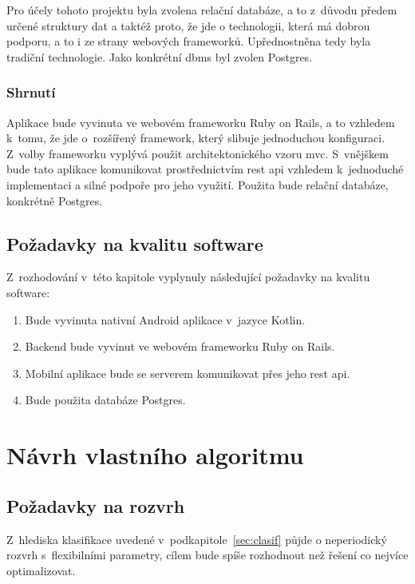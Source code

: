 \documentclass[a4paper,11pt,openany,twoside]{book}
\begin{document}
Pro účely tohoto projektu byla zvolena relační databáze, a to z~důvodu předem určené struktury dat a taktéž proto, že jde o technologii, která má dobrou podporu, a to i ze strany webových frameworků. Upřednostněna tedy byla tradiční technologie. Jako konkrétní \acs{dbms} byl zvolen Postgres.


\subsection{Shrnutí}

Aplikace bude vyvinuta ve webovém frameworku Ruby on Rails, a to vzhledem k~tomu, že jde o~rozšířený framework, který slibuje jednoduchou konfiguraci. Z~volby frameworku vyplývá použit architektonického vzoru \acs{mvc}. S~vnějškem bude tato aplikace komunikovat prostřednictvím \acs{rest} \acs{api} vzhledem k~jednoduché implementaci a silné podpoře pro jeho využití. Použita bude relační databáze, konkrétně Postgres.

\section{Požadavky na kvalitu software}

Z~rozhodování v~této kapitole vyplynuly následující požadavky na kvalitu software:

\begin{enumerate}[label=\textbf{S\arabic*.}]
	\item Bude vyvinuta nativní Android aplikace v~jazyce Kotlin.
	\item Backend bude vyvinut ve webovém frameworku Ruby on Rails.
	\item Mobilní aplikace bude se serverem komunikovat přes jeho \acs{rest} \acs{api}.
	\item Bude použita databáze Postgres.
\end{enumerate}

\chapter{Návrh vlastního algoritmu}

\section{Požadavky na rozvrh}

Z~hlediska klasifikace uvedené v~podkapitole~\ref{sec:clasif} půjde o neperiodický rozvrh s~flexibilními parametry, cílem bude spíše rozhodnout než řešení co nejvíce optimalizovat.
\end{document}
